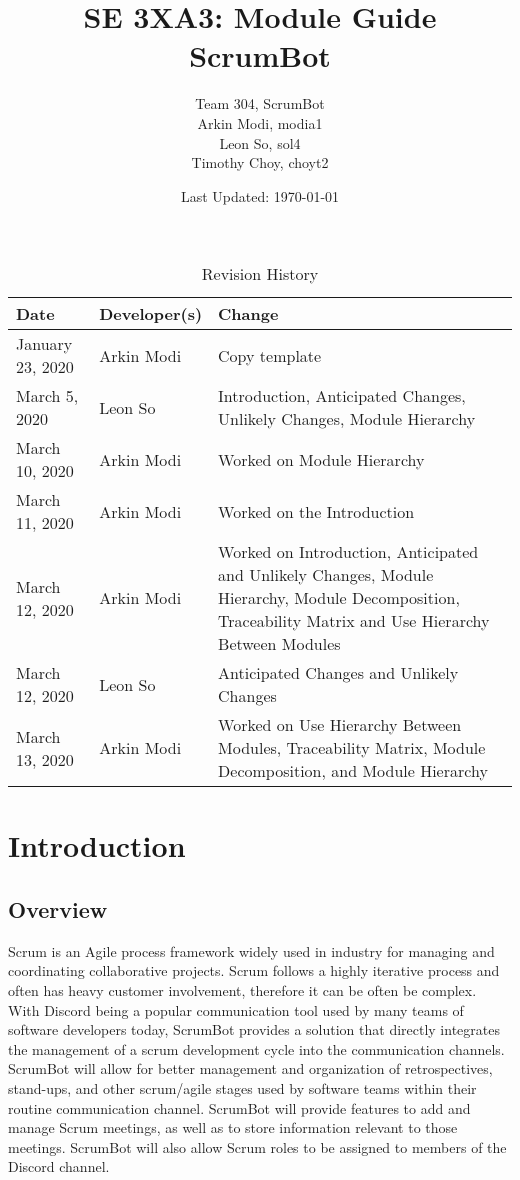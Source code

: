 \documentclass[12pt, titlepage]{article}
\title{SE 3XA3: Module Guide\\ScrumBot}
\author{
	Team 304, ScrumBot
		\\ Arkin Modi, modia1
        \\ Leon So, sol4
        \\ Timothy Choy, choyt2
}
\date{Last Updated: \today}
\begin{document}
\maketitle

\tableofcontents
\listoftables
\listoffigures

\begin{table}[H]
    \caption{Revision History} \label{TblRevisionHistory}
    \begin{tabularx}{\textwidth}{llX}
        \toprule
            \textbf{Date} & \textbf{Developer(s)} & \textbf{Change}\\
        \midrule
            January 23, 2020 & Arkin Modi & Copy template\\
            March 5, 2020 & Leon So & Introduction, Anticipated Changes, Unlikely Changes, Module Hierarchy\\
            March 10, 2020 & Arkin Modi & Worked on Module Hierarchy\\
            March 11, 2020 & Arkin Modi & Worked on the Introduction\\
            March 12, 2020 & Arkin Modi & Worked on Introduction, Anticipated and Unlikely Changes, Module Hierarchy, Module Decomposition, Traceability Matrix and Use Hierarchy Between Modules\\
            March 12, 2020 & Leon So & Anticipated Changes and Unlikely Changes\\
            March 13, 2020 & Arkin Modi & Worked on Use Hierarchy Between Modules, Traceability Matrix, Module Decomposition, and Module Hierarchy\\
        \bottomrule
    \end{tabularx}
\end{table}

\newpage


\section{Introduction}
\subsection{Overview} 
Scrum is an Agile process framework widely used in industry for managing and coordinating collaborative projects. Scrum follows a highly iterative process and often has heavy customer involvement, therefore it can be often be complex. With Discord being a popular communication tool used by many teams of software developers today, ScrumBot provides a solution that directly integrates the management of a scrum development cycle into the communication channels. ScrumBot will allow for better management and organization of retrospectives, stand-ups, and other scrum/agile stages used by software teams within their routine communication channel. ScrumBot will provide features to add and manage Scrum meetings, as well as to store information relevant to those meetings. ScrumBot will also allow Scrum roles to be assigned to members of the Discord channel.
\end{document}
